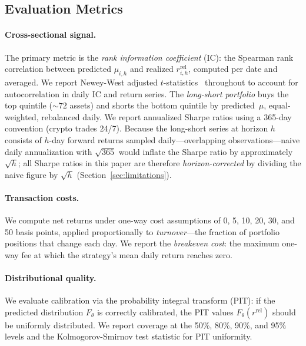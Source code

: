 \documentclass[sigconf]{acmart}
\begin{document}
\subsection{Evaluation Metrics}

\paragraph{Cross-sectional signal.}
The primary metric is the \emph{rank information coefficient} (IC): the Spearman rank correlation between predicted $\mu_{i,h}$ and realized $r^{\text{rel}}_{i,h}$, computed per date and averaged.
We report Newey-West adjusted $t$-statistics~\cite{newey1987} throughout to account for autocorrelation in daily IC and return series.
The \emph{long-short portfolio} buys the top quintile ($\sim\!72$ assets) and shorts the bottom quintile by predicted~$\mu$, equal-weighted, rebalanced daily.
We report annualized Sharpe ratios using a 365-day convention (crypto trades 24/7).
Because the long-short series at horizon $h$ consists of $h$-day forward returns sampled daily---overlapping observations---naive daily annualization with $\sqrt{365}$ would inflate the Sharpe ratio by approximately $\sqrt{h}$; all Sharpe ratios in this paper are therefore \emph{horizon-corrected} by dividing the naive figure by $\sqrt{h}$ (Section~\ref{sec:limitations}).

\paragraph{Transaction costs.}
We compute net returns under one-way cost assumptions of 0, 5, 10, 20, 30, and 50 basis points, applied proportionally to \emph{turnover}---the fraction of portfolio positions that change each day.
We report the \emph{breakeven cost}: the maximum one-way fee at which the strategy's mean daily return reaches zero.

\paragraph{Distributional quality.}
We evaluate calibration via the probability integral transform (PIT): if the predicted distribution $F_\theta$ is correctly calibrated, the PIT values $F_\theta(r^{\text{rel}})$ should be uniformly distributed.
We report coverage at the 50\%, 80\%, 90\%, and 95\% levels and the Kolmogorov-Smirnov test statistic for PIT uniformity.

\end{document}
